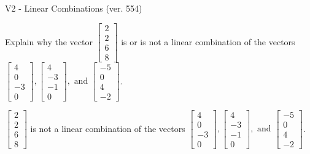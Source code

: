 \begin{exercise}
  \begin{exerciseTitle}V2 - Linear Combinations (ver. 554)\end{exerciseTitle}
  \begin{exerciseStatement}
    Explain why the vector \(\left[\begin{array}{c}
2 \\
2 \\
6 \\
8
\end{array}\right]\)  is or is not a linear 
	combination of the vectors \(\left[\begin{array}{c}
4 \\
0 \\
-3 \\
0
\end{array}\right] , \left[\begin{array}{c}
4 \\
-3 \\
-1 \\
0
\end{array}\right] , \text{ and } \left[\begin{array}{c}
-5 \\
0 \\
4 \\
-2
\end{array}\right]\).
	


  \end{exerciseStatement}
  \begin{exerciseAnswer}
   \(\left[\begin{array}{c}
2 \\
2 \\
6 \\
8
\end{array}\right]\) 
  	 is not  
	a linear combination of the vectors \(\left[\begin{array}{c}
4 \\
0 \\
-3 \\
0
\end{array}\right] , \left[\begin{array}{c}
4 \\
-3 \\
-1 \\
0
\end{array}\right] , \text{ and } \left[\begin{array}{c}
-5 \\
0 \\
4 \\
-2
\end{array}\right]\).

	
  


  \end{exerciseAnswer}
\end{exercise}